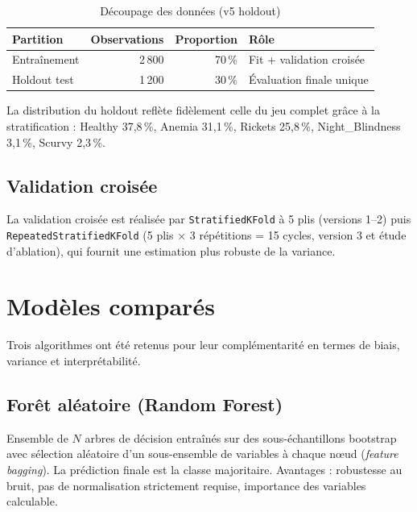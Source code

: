 \documentclass[12pt,a4paper]{article}
\begin{document}
\begin{table}[H]
\centering
\caption{Découpage des données (v5 holdout)}
\label{tab:split}
\begin{tabular}{lrrl}
\toprule
\textbf{Partition} & \textbf{Observations} & \textbf{Proportion} & \textbf{Rôle} \\
\midrule
Entraînement & 2\,800 & 70\,\% & Fit + validation croisée \\
Holdout test & 1\,200 & 30\,\% & Évaluation finale unique \\
\bottomrule
\end{tabular}
\end{table}

La distribution du holdout reflète fidèlement celle du jeu complet grâce à la
stratification : Healthy 37,8\,\%, Anemia 31,1\,\%, Rickets 25,8\,\%,
Night\_Blindness 3,1\,\%, Scurvy 2,3\,\%.

\subsection{Validation croisée}

La validation croisée est réalisée par \texttt{StratifiedKFold} à 5 plis
(versions 1--2) puis \texttt{RepeatedStratifiedKFold} (5 plis $\times$
3 répétitions = 15 cycles, version 3 et étude d'ablation), qui fournit une
estimation plus robuste de la variance.

\section{Modèles comparés}

Trois algorithmes ont été retenus pour leur complémentarité en termes de biais,
variance et interprétabilité.

\subsection{Forêt aléatoire (Random Forest)}

Ensemble de $N$ arbres de décision entraînés sur des sous-échantillons bootstrap
avec sélection aléatoire d'un sous-ensemble de variables à chaque nœud
(\emph{feature bagging}). La prédiction finale est la classe majoritaire.
Avantages : robustesse au bruit, pas de normalisation strictement requise,
importance des variables calculable.
\end{document}
